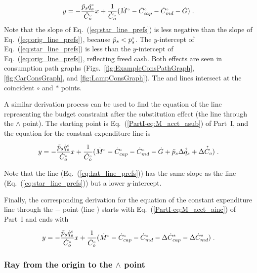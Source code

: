 \begin{equation} \label{eq:star_line_prefs}
  y = - \frac{\tilde{p}_s {}{\dot{q}}^{\scriptscriptstyle \circ}_s}{{}{\dot{C}}^{\scriptscriptstyle \circ}_o} x
         + \frac{1}{{}{\dot{C}}^{\scriptscriptstyle \circ}_o} ({}{\dot{M}}^{\scriptscriptstyle \circ} - {}{\dot{C}}^{\scriptscriptstyle \circ}_{cap} - {}{\dot{C}}^{\scriptscriptstyle \circ}_{md} - \dot{G}) \; .
\end{equation}
%
Note that the slope of Eq.~(\ref{eq:star_line_prefs}) is less negative
than the slope of Eq.~(\ref{eq:orig_line_prefs}), 
because $\tilde{p}_s < {}{p}^{\scriptscriptstyle \circ}_s$.
The $y$-intercept of Eq.~(\ref{eq:star_line_prefs}) is less than the 
$y$-intercept of Eq.~(\ref{eq:orig_line_prefs}),
reflecting freed cash.
Both effects are seen in
consumption path graphs 
(Figs.~\ref{fig:ExampleConsPathGraph}, \ref{fig:CarConsGraph}, and \ref{fig:LampConsGraph}).
The \circcirc{} and \starstar{} lines intersect at the coincident $\circ$ and $*$ points.

A similar derivation process can be used to find the equation of 
the line representing the budget constraint
after the substitution effect (the \hathat{} line through the $\wedge$ point).
The starting point is Eq.~(\ref{PartI-eq:M_acct_asub}) of Part~I, and 
the equation for the constant expenditure line is

\begin{equation} \label{eq:hat_line_prefs}
  y = - \frac{\tilde{p}_s {}{\dot{q}}^{\scriptscriptstyle \circ}_s}{{}{\dot{C}}^{\scriptscriptstyle \circ}_o} x
         + \frac{1}{{}{\dot{C}}^{\scriptscriptstyle \circ}_o} ({}{\dot{M}}^{\scriptscriptstyle \circ} - {}{\dot{C}}^{\scriptscriptstyle \circ}_{cap} - {}{\dot{C}}^{\scriptscriptstyle \circ}_{md} 
                                   - \dot{G} + \tilde{p}_s \Delta \hat{\dot{q}}_s + \Delta \hat{\dot{C}}_o) \; .
\end{equation}

Note that the \hathat{} line (Eq.~(\ref{eq:hat_line_prefs})) has the same slope as 
the \starstar{} line (Eq.~(\ref{eq:star_line_prefs}))
but a lower $y$-intercept.

Finally, the corresponding derivation
for the equation of the constant expenditure line through the 
$-$ point (line \barbar{}) starts with Eq.~(\ref{PartI-eq:M_acct_ainc}) of Part~I and ends with 

\begin{equation} \label{eq:bar_line_prefs}
  y = - \frac{\tilde{p}_s {}{\dot{q}}^{\scriptscriptstyle \circ}_s}{{}{\dot{C}}^{\scriptscriptstyle \circ}_o} x
        + \frac{1}{{}{\dot{C}}^{\scriptscriptstyle \circ}_o} ({}{\dot{M}}^{\scriptscriptstyle \circ} - {}{\dot{C}}^{\scriptscriptstyle \circ}_{cap} - {}{\dot{C}}^{\scriptscriptstyle \circ}_{md} 
                                   - \Delta {\dot{C}}^*_{cap} - \Delta {\dot{C}}^*_{md}) \; .
\end{equation}


\subsubsection{Ray from the origin to the $\wedge$ point} 
\label{sec:pref_graph_ray}

